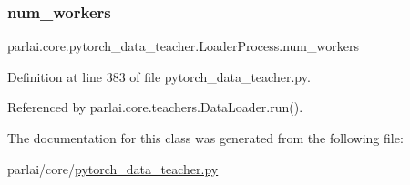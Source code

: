 \subsubsection{\texorpdfstring{num\+\_\+workers}{num\_workers}}
{\footnotesize\ttfamily parlai.\+core.\+pytorch\+\_\+data\+\_\+teacher.\+Loader\+Process.\+num\+\_\+workers}



Definition at line 383 of file pytorch\+\_\+data\+\_\+teacher.\+py.



Referenced by parlai.\+core.\+teachers.\+Data\+Loader.\+run().



The documentation for this class was generated from the following file\+:\begin{DoxyCompactItemize}
\item 
parlai/core/\hyperlink{pytorch__data__teacher_8py}{pytorch\+\_\+data\+\_\+teacher.\+py}\end{DoxyCompactItemize}
